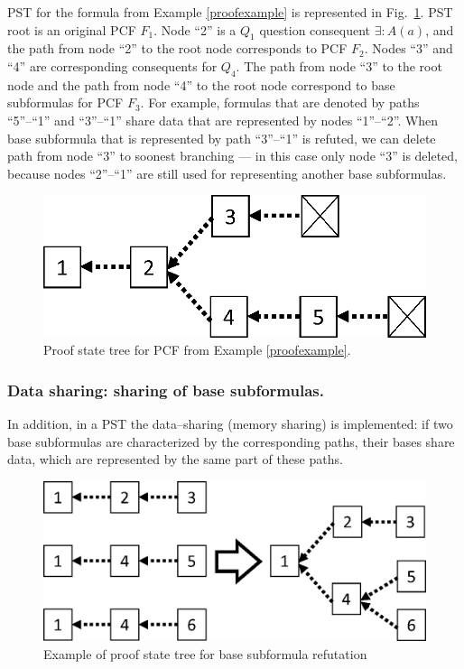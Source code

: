 \documentclass[runningheads,a4paper]{llncs}
\begin{document}
PST for the formula from Example \ref{proofexample} is represented in Fig.~\ref{fig:pst}.
PST root is an original PCF $F_1$. Node ``2'' is a  $Q_1$ question consequent $\exists\colon A(a)$, and the path from node ``2'' to the root node corresponds to PCF $F_2$. Nodes ``3'' and ``4'' are corresponding consequents for $Q_4$. The path from node ``3'' to the root node and the path from node ``4'' to the root node correspond to base subformulas for PCF $F_3$. For example, formulas that are denoted by paths ``5''--``1'' and ``3''--``1'' share data that are represented by nodes ``1''--``2''. When base subformula that is represented by path ``3''--``1'' is refuted, we can delete path from node ``3'' to soonest branching --- in this case only node ``3'' is deleted, because nodes ``2''--``1'' are still used for representing another base subformulas.
\begin{figure}[h]
  \centering
  \includegraphics[width=0.4\linewidth]{img/PSTp1.eps}
  \caption{Proof state tree for PCF from Example \ref{proofexample}.}
  \label{fig:pst}
\end{figure}

\subsubsection{Data sharing: sharing of base subformulas.}
In addition, in a PST the data--sharing (memory sharing) is implemented: if two base subformulas are characterized by the corresponding paths, their bases share data, which are represented by the same part of these paths.
\begin{figure}[h]
  \vspace{0.5cm}
  \centering
  \includegraphics[width=0.4\linewidth]{img/Graphsp1.eps}
  \caption{Example of proof state tree for base subformula refutation}
  \label{fig:datasharing1}
\end{figure}
\end{document}

